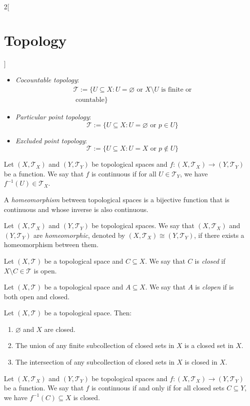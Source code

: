 \documentclass[../../../main.tex]{subfiles}
\begin{document}
\begin{multicols}{2}[\section{Topology}]
\begin{prop}
\begin{itemize}
      \item \textit{Cocountable topology}:
            \begin{multline*}
              \mathcal{T}:=\{U\subseteq X:U=\varnothing\text{ or }X\setminus U\text{ is finite or}\\\text{ countable}\}
            \end{multline*}
      \item \textit{Particular point topology}: $$\mathcal{T}:=\{U\subseteq X:U=\varnothing\text{ or }p\in U\}$$
      \item \textit{Excluded point topology}: $$\mathcal{T}:=\{U\subseteq X:U=X\text{ or }p\notin U\}$$
    \end{itemize}
  \end{prop}
  \begin{prop}
    Let $(X,\mathcal{T}_X)$ and $(Y,\mathcal{T}_Y)$ be topological spaces and $f:(X,\mathcal{T}_X)\rightarrow(Y,\mathcal{T}_Y)$ be a function. We say that $f$ is continuous if for all $U\in\mathcal{T}_Y$, we have $f^{-1}(U)\in\mathcal{T}_X$.
  \end{prop}
  \begin{definition}
    A \textit{homeomorphism} between topological spaces is a bijective function that is continuous and whose inverse is also continuous.
  \end{definition}
  \begin{definition}
    Let $(X,\mathcal{T}_X)$ and $(Y,\mathcal{T}_Y)$ be topological spaces. We say that $(X,\mathcal{T}_X)$ and $(Y,\mathcal{T}_Y)$ are \textit{homeomorphic}, denoted by $(X,\mathcal{T}_X)\cong(Y,\mathcal{T}_Y)$, if there exists a homeomorphism between them.
  \end{definition}
  \begin{definition}
    Let $(X,\mathcal{T})$ be a topological space and $C\subseteq X$. We say that $C$ is \textit{closed} if $X\setminus C\in\mathcal{T}$ is open.
  \end{definition}
  \begin{definition}
    Let $(X,\mathcal{T})$ be a topological space and $A\subseteq X$. We say that $A$ is \textit{clopen} if is both open and closed.
  \end{definition}
  \begin{prop}
    Let $(X,\mathcal{T})$ be a topological space. Then:
    \begin{enumerate}
      \item $\varnothing$ and $X$ are closed.
      \item The union of any finite subcollection of closed sets in $X$ is a closed set in $X$.
      \item The intersection of any subcollection of closed sets in $X$ is closed in $X$.
    \end{enumerate}
  \end{prop}
  \begin{prop}
    Let $(X,\mathcal{T}_X)$ and $(Y,\mathcal{T}_Y)$ be topological spaces and $f:(X,\mathcal{T}_X)\rightarrow(Y,\mathcal{T}_Y)$ be a function. We say that $f$ is continuous if and only if for all closed sets $C\subseteq Y$, we have $f^{-1}(C)\subseteq X$ is closed.
  \end{prop}

\end{multicols}
\end{document}
